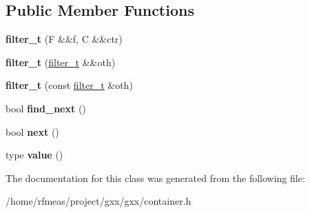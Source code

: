 \subsection*{Public Member Functions}
\begin{DoxyCompactItemize}
\item 
{\bfseries filter\+\_\+t} (F \&\&f, C \&\&ctr)\hypertarget{classgxx_1_1gen_1_1filter__t_a460f141cef40d93cdc96d2d2de8c635d}{}\label{classgxx_1_1gen_1_1filter__t_a460f141cef40d93cdc96d2d2de8c635d}

\item 
{\bfseries filter\+\_\+t} (\hyperlink{classgxx_1_1gen_1_1filter__t}{filter\+\_\+t} \&\&oth)\hypertarget{classgxx_1_1gen_1_1filter__t_adb28e66ae22efcedc262b9561275bb3b}{}\label{classgxx_1_1gen_1_1filter__t_adb28e66ae22efcedc262b9561275bb3b}

\item 
{\bfseries filter\+\_\+t} (const \hyperlink{classgxx_1_1gen_1_1filter__t}{filter\+\_\+t} \&oth)\hypertarget{classgxx_1_1gen_1_1filter__t_ac5fdf0fda25f9052ec024fafec5ef5a3}{}\label{classgxx_1_1gen_1_1filter__t_ac5fdf0fda25f9052ec024fafec5ef5a3}

\item 
bool {\bfseries find\+\_\+next} ()\hypertarget{classgxx_1_1gen_1_1filter__t_a5ed885e8c5a0a17105d9c037235449df}{}\label{classgxx_1_1gen_1_1filter__t_a5ed885e8c5a0a17105d9c037235449df}

\item 
bool {\bfseries next} ()\hypertarget{classgxx_1_1gen_1_1filter__t_a761ee6d8744e29745a2438670b07039c}{}\label{classgxx_1_1gen_1_1filter__t_a761ee6d8744e29745a2438670b07039c}

\item 
type {\bfseries value} ()\hypertarget{classgxx_1_1gen_1_1filter__t_af8f8c98c31f03aecc7134f6d759e7001}{}\label{classgxx_1_1gen_1_1filter__t_af8f8c98c31f03aecc7134f6d759e7001}

\end{DoxyCompactItemize}


The documentation for this class was generated from the following file\+:\begin{DoxyCompactItemize}
\item 
/home/rfmeas/project/gxx/gxx/container.\+h\end{DoxyCompactItemize}
